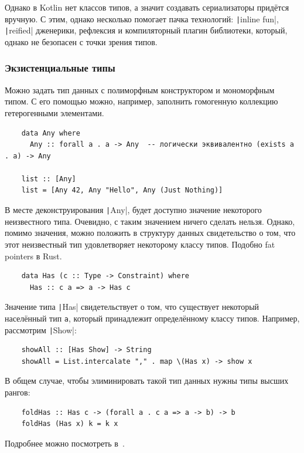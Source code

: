 Однако в Kotlin нет классов типов, а значит создавать сериализаторы придётся вручную.
С этим, однако несколько помогает пачка технологий: \texttt|inline fun|, \texttt|reified| дженерики, рефлексия и компиляторный плагин библиотеки, который, однако не безопасен с точки зрения типов.

\subsubsection{Экзистенциальные типы} \label{subsubsec:existentials}

Можно задать тип данных с полиморфным конструктором и мономорфным типом.
С его помощью можно, например, заполнить гомогенную коллекцию гетерогенными элементами.
\begin{verbatim}
    data Any where
      Any :: forall a . a -> Any  -- логически эквивалентно (exists a . a) -> Any

    list :: [Any]
    list = [Any 42, Any "Hello", Any (Just Nothing)]
\end{verbatim}

В месте деконструирования \texttt|Any|, будет доступно значение некоторого неизвестного типа.
Очевидно, с таким значением ничего сделать нельзя.
Однако, помимо значения, можно положить в структуру данных свидетельство о том, что этот неизвестный тип удовлетворяет некоторому классу типов.
Подобно fat pointers в Rust.
\begin{verbatim}
    data Has (c :: Type -> Constraint) where
      Has :: c a => a -> Has c
\end{verbatim}

Значение типа \texttt|Has| свидетельствует о том, что существует некоторый населённый тип \texttt{a}, который принадлежит определённому классу типов.
Например, рассмотрим \texttt|Show|:
\begin{verbatim}
    showAll :: [Has Show] -> String
    showAll = List.intercalate "," . map \(Has x) -> show x
\end{verbatim}

В общем случае, чтобы элиминировать такой тип данных нужны типы высших рангов:
\begin{verbatim}
    foldHas :: Has c -> (forall a . c a => a -> b) -> b
    foldHas (Has x) k = k x
\end{verbatim}

Подробнее можно посмотреть в~\cite[глава 7]{maguire-types}.

